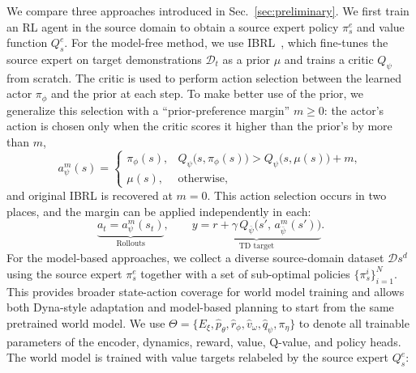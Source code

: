 \documentclass{article} %
\begin{document}
We compare three approaches introduced in Sec.~\ref{sec:preliminary}. We first train an RL agent in the source domain to obtain a source expert policy $\pi_s^e$ and value function $Q_s^e$. For the model-free method, we use IBRL~\citep{hu2023imitation}, which fine-tunes the source expert on target demonstrations $\mathcal{D}_t$ as a prior $\mu$ and trains a critic $Q_\psi$ from scratch. The critic is used to perform action selection between the learned actor $\pi_\phi$ and the prior at each step. To make better use of the prior, we generalize this selection with a ``prior-preference margin'' $m \ge 0$: the actor's action is chosen only when the critic scores it higher than the prior's by more than $m$,
\begin{equation}
a^{m}_{\psi}(s) =
\begin{cases}
\pi_\phi(s), & Q_\psi\big(s,\pi_\phi(s)\big) > Q_\psi\big(s,\mu(s)\big) + m,\\[2pt]
\mu(s), & \text{otherwise,}
\end{cases}
\label{eq:ibrl-margin}
\end{equation}
and original IBRL is recovered at $m=0$. This action selection occurs in two places, and the margin can be applied independently in each:
\begin{equation}
\underbrace{a_t = a^{m}_{\psi}(s_t)}_{\text{Rollouts}},
\qquad
\underbrace{y = r + \gamma\, Q_{\bar\psi}\!\big(s',\, a^{m}_{\bar\psi}(s')\big)}_{\text{TD target}}.
\label{eq:ibrl}
\end{equation}
For the model-based approaches, we collect a diverse source-domain dataset $\mathcal{D}s^d$ using the source expert $\pi_s^e$ together with a set of sub-optimal policies $\{\pi_s^i\}_{i=1}^N$. This provides broader state-action coverage for world model training and allows both Dyna-style adaptation and model-based planning to start from the same pretrained world model.
We use $\Theta=\{E_\xi, \hat p_\theta,\hat r_\phi, \hat v_\omega, \hat q_\psi, \pi_\eta\}$ to denote all trainable parameters of the encoder, dynamics, reward, value, Q-value, and policy heads. The world model is trained with value targets relabeled by the source expert $Q_s^e$:
\end{document}
